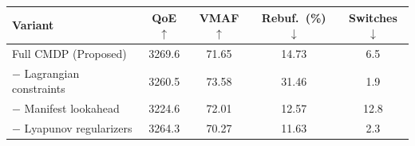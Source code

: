 \begin{tabularx}{\linewidth}{@{}>{\raggedright\arraybackslash}Xcccc@{}}
\toprule
\textbf{Variant} & \textbf{QoE}$\uparrow$ & \textbf{VMAF}$\uparrow$ & \textbf{Rebuf.\ (\%)}$\downarrow$ & \textbf{Switches}$\downarrow$ \\
\midrule
Full CMDP (Proposed)          & 3269.6 & 71.65 & 14.73 & 6.5 \\
$-$ Lagrangian constraints    & 3260.5 & 73.58 & 31.46 & 1.9 \\
$-$ Manifest lookahead        & 3224.6 & 72.01 & 12.57 & 12.8 \\
$-$ Lyapunov regularizers     & 3264.3 & 70.27 & 11.63 & 2.3 \\
\bottomrule
\end{tabularx}
